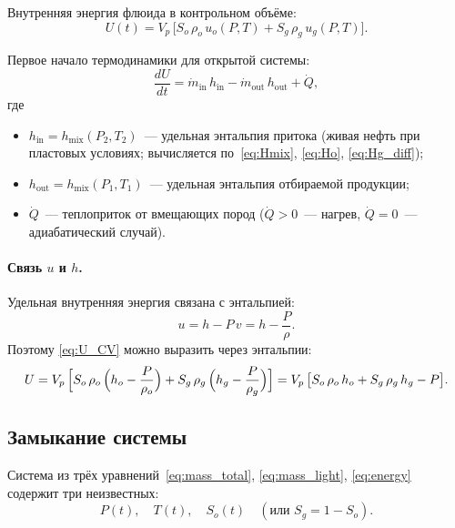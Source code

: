 \documentclass[12pt,a4paper]{article}
\begin{document}
Внутренняя энергия флюида в контрольном объёме:
\begin{equation}\label{eq:U_CV}
  U(t) = V_p\,\bigl[S_o\,\rho_o\,u_o(P,T) + S_g\,\rho_g\,u_g(P,T)\bigr].
\end{equation}

Первое начало термодинамики для открытой системы:
\begin{equation}\label{eq:energy}
  \boxed{\;
    \frac{dU}{dt}
    = \dot{m}_{\text{in}}\,h_{\text{in}}
    - \dot{m}_{\text{out}}\,h_{\text{out}}
    + \dot{Q},
  \;}
\end{equation}
где
\begin{itemize}[nosep]
  \item $h_{\text{in}} = h_{\mathrm{mix}}(P_2, T_2)$~--- удельная энтальпия
        притока (живая нефть при пластовых условиях; вычисляется
        по~\eqref{eq:Hmix}, \eqref{eq:Ho}, \eqref{eq:Hg_diff});
  \item $h_{\text{out}} = h_{\mathrm{mix}}(P_1, T_1)$~--- удельная энтальпия
        отбираемой продукции;
  \item $\dot{Q}$~--- теплоприток от вмещающих пород ($\dot{Q} > 0$~--- нагрев,
        $\dot{Q} = 0$~--- адиабатический случай).
\end{itemize}

\paragraph{Связь $u$ и $h$.}
Удельная внутренняя энергия связана с энтальпией:
\begin{equation}\label{eq:u_from_h}
  u = h - P\,v = h - \frac{P}{\rho}.
\end{equation}
Поэтому \eqref{eq:U_CV} можно выразить через энтальпии:
\begin{equation}\label{eq:U_via_h}
  U = V_p\,\Bigl[S_o\,\rho_o\,\Bigl(h_o - \frac{P}{\rho_o}\Bigr)
    + S_g\,\rho_g\,\Bigl(h_g - \frac{P}{\rho_g}\Bigr)\Bigr]
    = V_p\,\bigl[S_o\,\rho_o\,h_o + S_g\,\rho_g\,h_g - P\bigr].
\end{equation}

\subsection{Замыкание системы}

Система из трёх уравнений~\eqref{eq:mass_total},
\eqref{eq:mass_light}, \eqref{eq:energy} содержит три неизвестных:
\begin{equation}\label{eq:unknowns}
  P(t), \quad T(t), \quad S_o(t) \quad (\text{или } S_g = 1 - S_o).
\end{equation}
\end{document}
